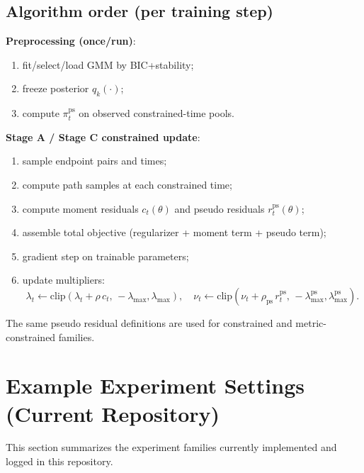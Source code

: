 \documentclass[11pt]{article}
\begin{document}
\subsection*{Algorithm order (per training step)}
\textbf{Preprocessing (once/run)}:
\begin{enumerate}
    \item fit/select/load GMM by BIC+stability;
    \item freeze posterior $q_k(\cdot)$;
    \item compute $\pi_t^{\mathrm{ps}}$ on observed constrained-time pools.
\end{enumerate}
\textbf{Stage A / Stage C constrained update}:
\begin{enumerate}
    \item sample endpoint pairs and times;
    \item compute path samples at each constrained time;
    \item compute moment residuals $c_t(\theta)$ and pseudo residuals $r_t^{\mathrm{ps}}(\theta)$;
    \item assemble total objective (regularizer + moment term + pseudo term);
    \item gradient step on trainable parameters;
    \item update multipliers:
    \[
    \lambda_t\leftarrow\mathrm{clip}(\lambda_t+\rho\,c_t,\,-\lambda_{\max},\lambda_{\max}),
    \quad
    \nu_t\leftarrow\mathrm{clip}(\nu_t+\rho_{\mathrm{ps}}\,r_t^{\mathrm{ps}},\,-\lambda_{\max}^{\mathrm{ps}},\lambda_{\max}^{\mathrm{ps}}).
    \]
\end{enumerate}
The same pseudo residual definitions are used for constrained and metric-constrained families.

\section{Example Experiment Settings (Current Repository)}
This section summarizes the experiment families currently implemented and logged in this repository.
\end{document}

